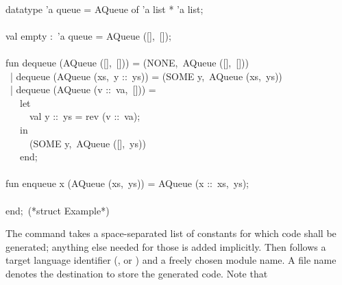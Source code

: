 \begin{isabellebody}
\begin{isamarkuptext}
\hspace*{0pt}\\
\hspace*{0pt}datatype 'a queue = AQueue of 'a list * 'a list;\\
\hspace*{0pt}\\
\hspace*{0pt}val empty :~'a queue = AQueue ([],~[]);\\
\hspace*{0pt}\\
\hspace*{0pt}fun dequeue (AQueue ([],~[])) = (NONE,~AQueue ([],~[]))\\
\hspace*{0pt} ~| dequeue (AQueue (xs,~y ::~ys)) = (SOME y,~AQueue (xs,~ys))\\
\hspace*{0pt} ~| dequeue (AQueue (v ::~va,~[])) =\\
\hspace*{0pt} ~~~let\\
\hspace*{0pt} ~~~~~val y ::~ys = rev (v ::~va);\\
\hspace*{0pt} ~~~in\\
\hspace*{0pt} ~~~~~(SOME y,~AQueue ([],~ys))\\
\hspace*{0pt} ~~~end;\\
\hspace*{0pt}\\
\hspace*{0pt}fun enqueue x (AQueue (xs,~ys)) = AQueue (x ::~xs,~ys);\\
\hspace*{0pt}\\
\hspace*{0pt}end;~(*struct Example*)%
\end{isamarkuptext}%
\isamarkuptrue%
%
\endisatagquote
{\isafoldquote}%
%
\isadelimquote
%
\endisadelimquote
%
\begin{isamarkuptext}%
\noindent The \hyperlink{command.export-code}{\mbox{}} command takes a space-separated list of
  constants for which code shall be generated;  anything else needed for those
  is added implicitly.  Then follows a target language identifier
  (,  or ) and a freely chosen module name.
  A file name denotes the destination to store the generated code.  Note that

\end{isamarkuptext}
\end{isabellebody}

